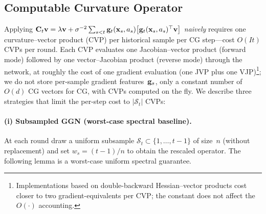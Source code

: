 \documentclass[twoside]{article}
\begin{document}
\subsection{Computable Curvature Operator}\label{sec:curvop}

Applying $\mathbf{C}_t\mathbf{v} = \lambda\mathbf{v} + \sigma^{-2}\sum_{s<t}\mathbf{g}_t(\mathbf{x}_s,a_s)\bigl[\mathbf{g}_t(\mathbf{x}_s,a_s)^\top\mathbf{v}\bigr]$
\emph{naively} requires one curvature--vector product (CVP) per historical
sample per CG step---cost $O(It)$ CVPs per round.
Each CVP evaluates one Jacobian--vector product (forward mode) followed by
one vector--Jacobian product (reverse mode) through the network, at roughly
the cost of one gradient evaluation (one JVP plus one VJP)\footnote{Implementations based on double-backward Hessian--vector
products cost closer to two gradient-equivalents per CVP; the constant
does not affect the $O(\cdot)$ accounting.}; we do not store
per-sample gradient features~$\mathbf{g}_s$, only a constant number of $O(d)$ CG vectors
for CG, with CVPs computed on the fly.
We describe three strategies that limit the per-step cost to $|\mathcal{S}_t|$
CVPs:

\paragraph{(i) Subsampled GGN (worst-case spectral baseline).}
At each round draw a uniform subsample $\mathcal{S}_t\subset\{1,\dots,t{-}1\}$
of size~$n$ (without replacement) and set $w_s=(t{-}1)/n$ to obtain the
rescaled operator.
The following lemma is a worst-case uniform spectral guarantee.
\end{document}
